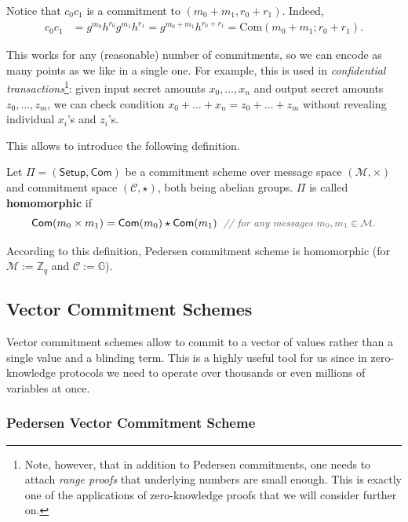 \documentclass[../../book]{subfiles}
\begin{document}
Notice that $c_0c_1$ is a commitment to $(m_0+m_1,r_0+r_1)$. Indeed,
\begin{align*}
    c_0c_1 &= g^{m_0}h^{r_0}g^{m_1}h^{r_1} = g^{m_0+m_1}h^{r_0+r_1} = \text{Com}(m_0+m_1;r_0+r_1).
\end{align*}

This works for any (reasonable) number of commitments, so we can encode as many points as we like in a single one.
For example, this is used in \emph{confidential transactions}\footnote{Note, however, that in addition to Pedersen commitments, one needs to attach \textit{range proofs} that underlying numbers are small enough. This is exactly one of the applications of zero-knowledge proofs that we will consider further on.}: given input secret amounts $x_0,\dots,x_n$ and output secret amounts $z_0,\dots,z_m$, we can check condition $x_0+\dots+x_n=z_0+\dots+z_m$ without revealing individual $x_i$'s and $z_i$'s.

This allows to introduce the following definition.

\begin{definition}
    Let $\Pi=(\mathsf{Setup},\mathsf{Com})$ be a commitment scheme over message space $(\mathcal{M},\times)$ and commitment space $(\mathcal{C},\star)$, both being abelian groups.
    $\Pi$ is called \textbf{homomorphic} if
    \begin{equation*}
        \mathsf{Com}(m_0 \times m_1) = \mathsf{Com}(m_0) \star \mathsf{Com}(m_1) \; \commentgray{for any messages $m_0,m_1 \in \mathcal{M}$.}
    \end{equation*}
\end{definition}

According to this definition, Pedersen commitment scheme is homomorphic (for $\mathcal{M}:=\mathbb{Z}_q$ and $\mathcal{C}:=\mathbb{G}$).

\subsection{Vector Commitment Schemes}

Vector commitment schemes allow to commit to a vector of values rather than a single value and a blinding term.
This is a highly useful tool for us since in zero-knowledge protocols we need to operate over thousands or even millions of variables at once.

\subsubsection{Pedersen Vector Commitment Scheme}
\end{document}

